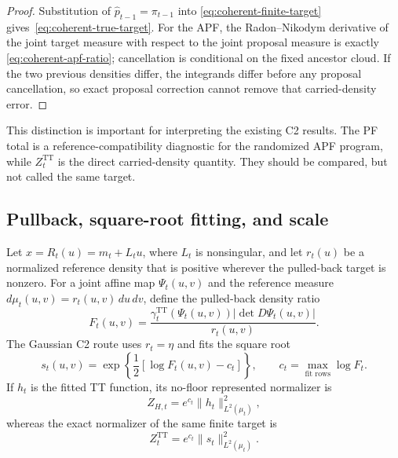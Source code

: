 \documentclass[11pt]{article}
\begin{document}
\begin{proof}
Substitution of $\widehat p_{t-1}=\pi_{t-1}$ into
\eqref{eq:coherent-finite-target} gives~\eqref{eq:coherent-true-target}.
For the APF, the Radon--Nikodym derivative of the joint target measure with
respect to the joint proposal measure is exactly
\eqref{eq:coherent-apf-ratio}; cancellation is conditional on the fixed
ancestor cloud. If the two previous densities differ, the integrands differ
before any proposal cancellation, so exact proposal correction cannot remove
that carried-density error.
\end{proof}

This distinction is important for interpreting the existing C2 results. The
PF total is a reference-compatibility diagnostic for the randomized APF
program, while $Z_t^{\mathrm{TT}}$ is the direct carried-density quantity.
They should be compared, but not called the same target.

\subsection{Pullback, square-root fitting, and scale}

Let $x=R_t(u)=m_t+L_tu$, where $L_t$ is nonsingular, and let $r_t(u)$ be a
normalized reference density that is positive wherever the pulled-back target
is nonzero. For a joint affine map $\Psi_t(u,v)$ and the reference measure
$d\mu_t(u,v)=r_t(u,v)\,du\,dv$, define the pulled-back density
ratio
\begin{equation}\label{eq:coherent-pullback}
  F_t(u,v)=
  \frac{\gamma_t^{\mathrm{TT}}(\Psi_t(u,v))
        |\det D\Psi_t(u,v)|}{r_t(u,v)}.
\end{equation}
The Gaussian C2 route uses $r_t=\eta$ and fits the square root
\begin{equation}\label{eq:coherent-square-root}
  s_t(u,v)=\exp\left\{\frac12[\log F_t(u,v)-c_t]\right\},
  \qquad c_t=\max_{\text{fit rows}}\log F_t.
\end{equation}
If $h_t$ is the fitted TT function, its no-floor represented normalizer is
\begin{equation}\label{eq:coherent-fitted-normalizer}
  Z_{H,t}=e^{c_t}\|h_t\|_{L^2(\mu_t)}^2,
\end{equation}
whereas the exact normalizer of the same finite target is
\begin{equation}\label{eq:coherent-target-normalizer}
  Z_t^{\mathrm{TT}}=e^{c_t}\|s_t\|_{L^2(\mu_t)}^2.
\end{equation}
\end{document}
